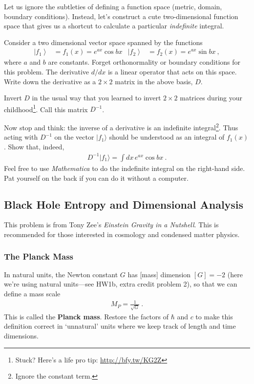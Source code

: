 \documentclass[12pt]{article}
\numberwithin{equation}{subsection}    %
\begin{document}
Let us ignore the subtleties of defining a function space (metric, domain, boundary conditions). Instead, let's construct a cute two-dimensional function space that gives us a shortcut to calculate a particular \emph{indefinite} integral. 

Consider a two dimensional vector space spanned by the functions
\begin{align}
	\left|f_1\right\rangle
	&= f_1(x) = 
	e^{ax} \cos bx
	&
	\left|f_2\right\rangle
	&=
	f_2(x) = 
	e^{ax} \sin bx \ ,
\end{align}
where $a$ and $b$ are constants. Forget orthonormality or boundary conditions for this problem. The derivative $d/dx$ is a linear operator that acts on this space. Write down the derivative as a $2\times 2$ matrix in the above basis, $D$.

Invert $D$ in the usual way that you learned to invert $2\times 2$ matrices during your childhood\footnote{Stuck? Here's a life pro tip: \url{http://bfy.tw/KG2Z}}. Call this matrix $D^{-1}$. 

Now stop and think: the inverse of a derivative is an indefinite integral\footnote{Ignore the constant term.}. Thus acting with $D^{-1}$ on the vector $|f_1\rangle$ should be understood as an integral of $f_1(x)$. Show that, indeed,
\begin{align}
	D^{-1} |f_1\rangle = \int dx\, e^{ax} \cos bx \ .
\end{align}
Feel free to use \emph{Mathematica} to do the indefinite integral on the right-hand side. Pat yourself on the back if you can do it without a computer.







\subsection{Black Hole Entropy and Dimensional Analysis}

This problem is from Tony Zee's \emph{Einstein Gravity in a Nutshell}. This is recommended for those interested in cosmology and condensed matter physics.

\subsubsection{The Planck Mass}

In natural units, the Newton constant $G$ has [mass] dimension $[G] = -2$ (here we're using natural units---see HW1b, extra credit problem 2), so that we can define a mass scale
\begin{align}
	M_P = \frac{1}{\sqrt{G}} \ .
\end{align}
This is called the \textbf{Planck mass}. Restore the factors of $\hbar$ and $c$ to make this definition correct in `unnatural' units where we keep track of length and time dimensions.
\end{document}
